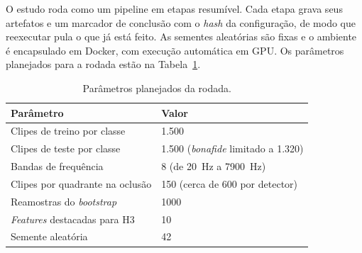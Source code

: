 \documentclass[11pt,a4paper]{article}
\begin{document}
O estudo roda como um pipeline em etapas resumível. Cada etapa grava seus
artefatos e um marcador de conclusão com o \emph{hash} da configuração, de modo
que reexecutar pula o que já está feito. As sementes aleatórias são fixas e o
ambiente é encapsulado em Docker, com execução automática em GPU. Os parâmetros
planejados para a rodada estão na Tabela~\ref{tab:config}.

\begin{table}[t]
  \centering
  \caption{Parâmetros planejados da rodada.}
  \label{tab:config}
  \begin{tabular}{ll}
    \toprule
    Parâmetro & Valor \\
    \midrule
    Clipes de treino por classe & 1.500 \\
    Clipes de teste por classe & 1.500 (\emph{bonafide} limitado a 1.320) \\
    Bandas de frequência & 8 (de 20~Hz a 7900~Hz) \\
    Clipes por quadrante na oclusão & 150 (cerca de 600 por detector) \\
    Reamostras do \emph{bootstrap} & 1000 \\
    \emph{Features} destacadas para H3 & 10 \\
    Semente aleatória & 42 \\
    \bottomrule
  \end{tabular}
\end{table}
\end{document}
